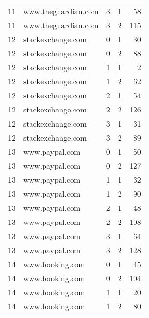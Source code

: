 \begin{tabular}{rllrr}
 11 &  www.theguardian.com &                  3 &       1 &               58 \\
 11 &  www.theguardian.com &                  3 &       2 &              115 \\
 12 &    stackexchange.com &                  0 &       1 &               30 \\
 12 &    stackexchange.com &                  0 &       2 &               88 \\
 12 &    stackexchange.com &                  1 &       1 &                2 \\
 12 &    stackexchange.com &                  1 &       2 &               62 \\
 12 &    stackexchange.com &                  2 &       1 &               54 \\
 12 &    stackexchange.com &                  2 &       2 &              126 \\
 12 &    stackexchange.com &                  3 &       1 &               31 \\
 12 &    stackexchange.com &                  3 &       2 &               89 \\
 13 &       www.paypal.com &                  0 &       1 &               50 \\
 13 &       www.paypal.com &                  0 &       2 &              127 \\
 13 &       www.paypal.com &                  1 &       1 &               32 \\
 13 &       www.paypal.com &                  1 &       2 &               90 \\
 13 &       www.paypal.com &                  2 &       1 &               48 \\
 13 &       www.paypal.com &                  2 &       2 &              108 \\
 13 &       www.paypal.com &                  3 &       1 &               64 \\
 13 &       www.paypal.com &                  3 &       2 &              128 \\
 14 &      www.booking.com &                  0 &       1 &               45 \\
 14 &      www.booking.com &                  0 &       2 &              104 \\
 14 &      www.booking.com &                  1 &       1 &               20 \\
 14 &      www.booking.com &                  1 &       2 &               80 \\

\end{tabular}
